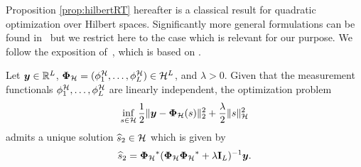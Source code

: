 \documentclass[12pt]{article}
\begin{document}
    
   Proposition \ref{prop:hilbertRT} hereafter is a classical result for quadratic optimization over Hilbert spaces. Significantly more general formulations can be found in~\cite{Scholkopf2001generalized} but we restrict here to the case which is relevant for our purpose. We follow the exposition of~\cite[Theorem~7]{caponera2021nonparametric}, which is based on \cite[Section~3.2]{Unser2020}. 

    \begin{proposition}
    \label{prop:hilbertRT}
    Let $\bm{y}\in \mathbb{R}^L$, ${\bm{\Phi}_\mathcal{H}}= (\phi^\mathcal{H}_1 ,\ldots , \phi^\mathcal{H}_L) \in \mathcal{H}^L$, and $\lambda > 0$. Given that the measurement functionals $\phi^\mathcal{H}_1, \dots, \phi^\mathcal{H}_L$ are linearly independent, the optimization problem 
    \begin{equation} \label{eq:hibertpb}
        \inf_{s \in \mathcal{H}} \frac{1}{2} \| \bm{y} - {\bm{\Phi}_\mathcal{H}}(s) \|_2^2 + \frac{\lambda}{2} \| s \|_{\mathcal{H}}^2
    \end{equation}
    admits a unique solution $\widehat{s}_2 \in \mathcal{H}$ which is given by
    \begin{equation} \label{eq:widehathilb}
        \widehat{s}_2  = {\bm{\Phi}_\mathcal{H}}^* ( {\bm{\Phi}_\mathcal{H}} {\bm{\Phi}_\mathcal{H}}^* + \lambda \mathbf{I}_L)^{-1} \bm{y}.
    \end{equation}
    \end{proposition}
    
\end{document}
